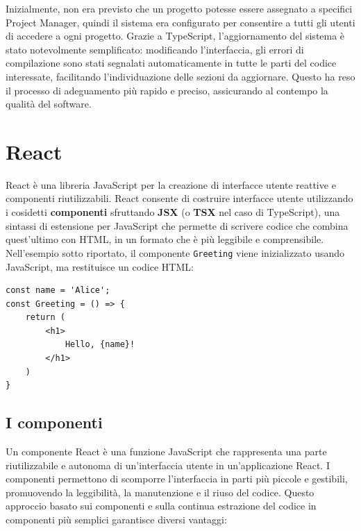 \documentclass[target=bach,aauheader=,style=]{thud}
\begin{document}
\noindent Inizialmente, non era previsto che un progetto potesse essere assegnato a specifici Project Manager, quindi il sistema era configurato per consentire a tutti gli utenti di accedere a ogni progetto. Grazie a TypeScript, l'aggiornamento del sistema è stato notevolmente semplificato: modificando l'interfaccia, gli errori di compilazione sono stati segnalati automaticamente in tutte le parti del codice interessate, facilitando l'individuazione delle sezioni da aggiornare. Questo ha reso il processo di adeguamento più rapido e preciso, assicurando al contempo la qualità del software.

\section{React}
React è una libreria JavaScript per la creazione di interfacce utente reattive e componenti riutilizzabili. React consente di costruire interfacce utente utilizzando i cosidetti \textbf{componenti} sfruttando \textbf{JSX} (o \textbf{TSX} nel caso di TypeScript), una sintassi di estensione per JavaScript che permette di scrivere codice che combina quest'ultimo con HTML, in un formato che è più leggibile e comprensibile. Nell'esempio sotto riportato, il componente \texttt{Greeting} viene inizializzato usando JavaScript, ma restituisce un codice HTML:

\begin{lstlisting}[language=React, caption=Esempio di codice React]
const name = 'Alice';   
const Greeting = () => {
    return (
        <h1>
            Hello, {name}!
        </h1>
    )
} 
\end{lstlisting}

\subsection{I componenti}
Un componente React è una funzione JavaScript che rappresenta una parte riutilizzabile e autonoma di un'interfaccia utente in un'applicazione React. I componenti permettono di scomporre l'interfaccia in parti più piccole e gestibili, promuovendo la leggibilità, la manutenzione e il riuso del codice. Questo approccio basato sui componenti e sulla continua estrazione del codice in componenti più semplici garantisce diversi vantaggi:
\end{document}
